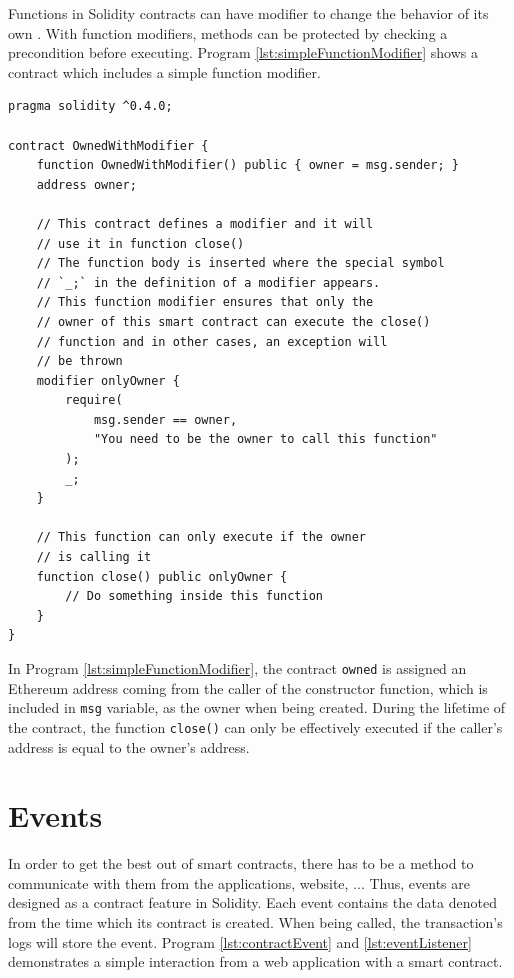 \documentclass[twoside,numperchapter]{tutthesis} %
\begin{document}
Functions in Solidity contracts can have modifier to change the behavior of its own \citep{SolidityDocumentation}. With function modifiers, methods can be protected by checking a precondition before executing. Program \ref{lst:simpleFunctionModifier} shows a contract which includes a simple function modifier.

\begin{lstlisting}[float,caption={Simple function modifier in a contract \citep{SolidityDocumentation}.},label={lst:simpleFunctionModifier},language=Solidity,float=h,floatplacement=h]
pragma solidity ^0.4.0;

contract OwnedWithModifier {
    function OwnedWithModifier() public { owner = msg.sender; }
    address owner;

    // This contract defines a modifier and it will
    // use it in function close()
    // The function body is inserted where the special symbol
    // `_;` in the definition of a modifier appears.
    // This function modifier ensures that only the
    // owner of this smart contract can execute the close()
    // function and in other cases, an exception will
    // be thrown
    modifier onlyOwner {
        require(
            msg.sender == owner,
            "You need to be the owner to call this function"
        );
        _;
    }
    
    // This function can only execute if the owner
    // is calling it
    function close() public onlyOwner {
        // Do something inside this function
    }
}
\end{lstlisting}

In Program \ref{lst:simpleFunctionModifier}, the contract \texttt{owned} is assigned an Ethereum address coming from the caller of the constructor function, which is included in \texttt{msg} variable, as the owner when being created. During the lifetime of the contract, the function \texttt{close()} can only be effectively executed if the caller's address is equal to the owner's address.

\section{Events}

In order to get the best out of smart contracts, there has to be a method to communicate with them from the applications, website, ... Thus, events are designed as a contract feature in Solidity. Each event contains the data denoted from the time which its contract is created. When being called, the transaction's logs will store the event. Program \ref{lst:contractEvent} and \ref{lst:eventListener} demonstrates a simple interaction from a web application with a smart contract.
\end{document}
